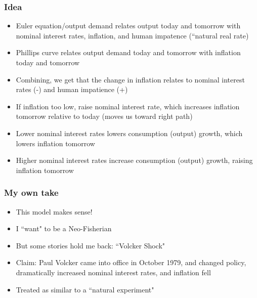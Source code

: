 \documentclass{beamer}
\begin{document}
\begin{frame}
\frametitle[alignment=center]{Idea}
\begin{itemize}
\item Euler equation/output demand relates output today and tomorrow with nominal interest rates, inflation, and human impatence (``natural real rate)
\bigskip
\item Phillips curve relates output demand today and tomorrow with inflation today and tomorrow
\bigskip
\item Combining, we get that the change in inflation relates to nominal interest rates (-) and human impatience (+)
\bigskip
\item If inflation too low, raise nominal interest rate, which increases inflation tomorrow relative to today (moves us toward right path)
\bigskip
\item Lower nominal interest rates lowers consumption (output) growth, which lowers inflation tomorrow
\bigskip
\item Higher nominal interest rates increase consumption (output) growth, raising inflation tomorrow 
\end{itemize}
\end{frame}

\begin{frame}
\frametitle[alignment=center]{My own take}
\begin{itemize}
\item This model makes sense!
\bigskip
\item I ``want" to be a Neo-Fisherian
\bigskip
\item But some stories hold me back: ``Volcker Shock" 
\bigskip
\item Claim: Paul Volcker came into office in October 1979, and changed policy, dramatically increased nominal interest rates, and inflation fell
\bigskip
\item Treated as similar to a ``natural experiment"
\end{itemize}
\end{frame}
\end{document}
